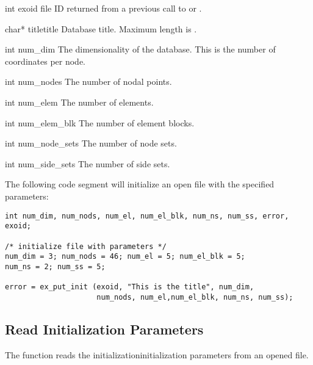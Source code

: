 
\begin{parameters}
\item[int exoid \R{}]
\exo{} file ID returned from a previous call to 
or .

\item[{char* titletitle \R{}}]
Database title. Maximum length is .

\item[{int num_dim \R{}}]
The dimensionality of the database. This is the number of coordinates
per node.

\item[{int num_nodes \R{}}]
The number of nodal points.

\item[{int num_elem \R{}}]
The number of elements.

\item[{int num_elem_blk \R{}}]
The number of element blocks.

\item[{int num_node_sets \R{}}]
The number of node sets.

\item[{int num_side_sets \R{}}]
The number of side sets.
\end{parameters}

The following code segment will initialize an open \exo{} file with
the specified parameters:

\begin{lstlisting}
int num_dim, num_nods, num_el, num_el_blk, num_ns, num_ss, error, exoid;

/* initialize file with parameters */
num_dim = 3; num_nods = 46; num_el = 5; num_el_blk = 5;
num_ns = 2; num_ss = 5;

error = ex_put_init (exoid, "This is the title", num_dim,
                     num_nods, num_el,num_el_blk, num_ns, num_ss);
\end{lstlisting}


\subsection{Read Initialization Parameters}

The function  reads the
initializationinitialization parameters from an opened
\exo{} file.

